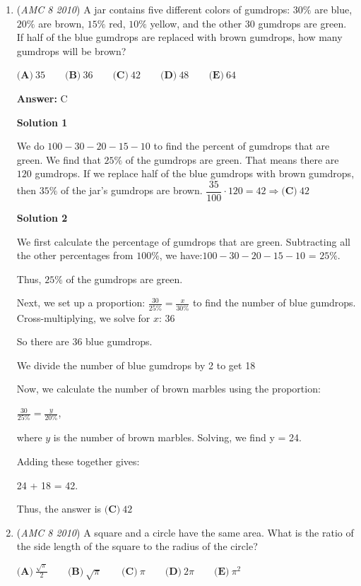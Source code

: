 \begin{enumerate}
	\item (\textit{AMC 8 2010}) A jar contains five different colors of gumdrops: $30\%$ are blue, $20\%$ are brown, $15\%$ red, $10\%$ yellow, and the other $30$ gumdrops are green. If half of the blue gumdrops are replaced with brown gumdrops, how many gumdrops will be brown?


 $\textbf{(A)}\ 35 \qquad\textbf{(B)}\ 36\qquad\textbf{(C)}\ 42\qquad\textbf{(D)}\ 48\qquad\textbf{(E)}\ 64$

 \textbf{Answer: }C



\textbf{Solution 1}

We do $100-30-20-15-10$ to find the percent of gumdrops that are green. We find that $25\%$ of the gumdrops are green. That means there are $120$ gumdrops. If we replace half of the blue gumdrops with brown gumdrops, then $35\%$ of the jar's gumdrops are brown. $\dfrac{35}{100} \cdot 120=42 \Rightarrow \boxed{\textbf{(C)}\ 42}$




\textbf{Solution 2}

We first calculate the percentage of gumdrops that are green. Subtracting all the other percentages from \(100\%\), we have:$100-30-20-15-10$ = $25\%$.

 Thus, $25\%$ of the gumdrops are green.

 Next, we set up a proportion: \(\frac{30}{25\%} = \frac{x}{30\%}\) to find the number of blue gumdrops. Cross-multiplying, we solve for \(x\): 36

 So there are 36 blue gumdrops.

 We divide the number of blue gumdrops by 2 to get 18

 
Now, we calculate the number of brown marbles using the proportion:

 \(\frac{30}{25\%} = \frac{y}{20\%}\),

 where \(y\) is the number of brown marbles. Solving, we find y = 24.

 Adding these together gives:

 24 + 18 = 42.

 Thus, the answer is $\boxed{\textbf{(C)}\ 42}$



	\item (\textit{AMC 8 2010}) A square and a circle have the same area. What is the ratio of the side length of the square to the radius of the circle? 


 $\textbf{(A)}\  \frac{\sqrt{\pi}}{2}  \qquad\textbf{(B)}\ \sqrt{\pi} \qquad\textbf{(C)}\ \pi \qquad\textbf{(D)}\ 2\pi \qquad\textbf{(E)}\ \pi^{2}$


\end{enumerate}
